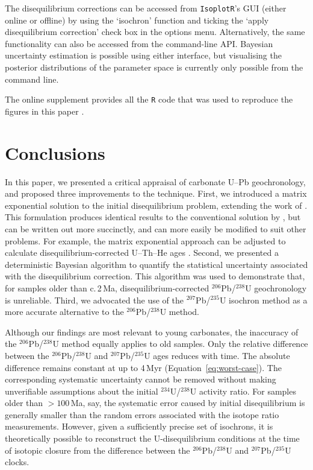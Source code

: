 \documentclass{article}
\begin{document}
The disequilibrium corrections can be accessed from
\texttt{IsoplotR}'s GUI (either online or offline) by using the
`isochron' function and ticking the `apply disequilibrium correction'
check box in the options menu. Alternatively, the same functionality
can also be accessed from the command-line API. Bayesian uncertainty
estimation is possible using either interface, but visualising the
posterior distributions of the parameter space is currently only
possible from the command line.\medskip

The online supplement provides all the \texttt{R} code that was used
to reproduce the figures in this paper \citep{vermeesch2025z}.

\section{Conclusions}\label{sec:conclusions}

In this paper, we presented a critical appraisal of carbonate U--Pb
geochronology, and proposed three improvements to the
technique. First, we introduced a matrix exponential solution to the
initial disequilibrium problem, extending the work of
\citet{albarede1995}. This formulation produces identical results to
the conventional solution by \citet{engel2019}, but can be written out
more succinctly, and can more easily be modified to suit other
problems. For example, the matrix exponential approach can be adjusted
to calculate disequilibrium-corrected U--Th--He ages
\citep{farley2002b,danisik2017b}.  Second, we presented a
deterministic Bayesian algorithm to quantify the statistical
uncertainty associated with the disequilibrium correction. This
algorithm was used to demonstrate that, for samples older than
c.\,2\,Ma, disequilibrium-corrected ${}^{206}$Pb/${}^{238}$U
geochronology is unreliable. Third, we advocated the use of the
${}^{207}$Pb/${}^{235}$U isochron method as a more accurate
alternative to the ${}^{206}$Pb/${}^{238}$U method.\medskip

Although our findings are most relevant to young carbonates, the
inaccuracy of the ${}^{206}$Pb/${}^{238}$U method equally applies to
old samples.  Only the relative difference between the
${}^{206}$Pb/${}^{238}$U and ${}^{207}$Pb/${}^{235}$U ages reduces
with time. The absolute difference remains constant at up to 4\,Myr
(Equation~\ref{eq:worst-case}). The corresponding systematic
uncertainty cannot be removed without making unverifiable assumptions
about the initial ${}^{234}$U/${}^{238}$U activity ratio.  For samples
older than $>100$\,Ma, say, the systematic error caused by initial
disequilibrium is generally smaller than the random errors associated
with the isotope ratio measurements. However, given a sufficiently
precise set of isochrons, it is theoretically possible to reconstruct
the U-disequilibrium conditions at the time of isotopic closure from
the difference between the ${}^{206}$Pb/${}^{238}$U and
${}^{207}$Pb/${}^{235}$U clocks.\medskip
\end{document}
